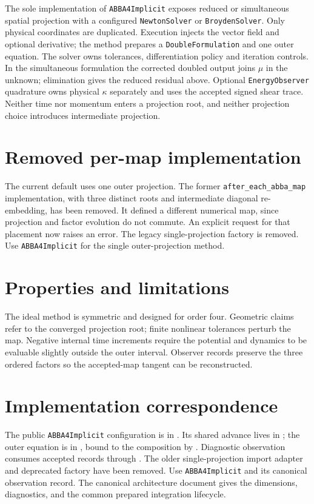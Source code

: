 \documentclass[11pt,a4paper]{article}
\begin{document}
The sole implementation of \texttt{ABBA4Implicit} exposes reduced or
simultaneous spatial projection with a configured \texttt{NewtonSolver} or
\texttt{BroydenSolver}. Only physical coordinates are duplicated. Execution
injects the vector field and optional derivative; the method prepares a
\texttt{DoubleFormulation} and one outer equation. The solver owns tolerances,
differentiation policy and iteration controls.
In the simultaneous formulation the corrected doubled output joins $\mu$ in
the unknown; elimination gives the reduced residual above. Optional
\texttt{EnergyObserver} quadrature owns physical $\kappa$ separately and uses
the accepted signed shear trace. Neither time nor momentum enters a projection
root, and neither projection choice introduces intermediate projection.

\section{Removed per-map implementation}

The current default uses one outer projection. The former
\texttt{after\_each\_abba\_map} implementation, with three distinct roots and
intermediate diagonal re-embedding, has been removed. It defined a different
numerical map, since projection and factor evolution do not commute.
An explicit request for that placement now raises an error.
The legacy single-projection factory is removed. Use \texttt{ABBA4Implicit}
for the single outer-projection method.

\section{Properties and limitations}

The ideal method is symmetric and designed for order four.  Geometric claims
refer to the converged projection root; finite nonlinear tolerances perturb the
map.  Negative internal time increments require the potential and dynamics to
be evaluable slightly outside the outer interval.  Observer records preserve
the three ordered factors so the accepted-map tangent can be reconstructed.

\section{Implementation correspondence}

The public \texttt{ABBA4Implicit} configuration is in
. Its shared advance lives in
; the outer equation is in
, bound to the composition by
. Diagnostic observation consumes
accepted records through .
The older single-projection import adapter and deprecated factory have been
removed. Use \texttt{ABBA4Implicit} and its canonical observation record.  The canonical architecture document
 gives the
dimensions, diagnostics, and the common prepared integration lifecycle.
\end{document}
